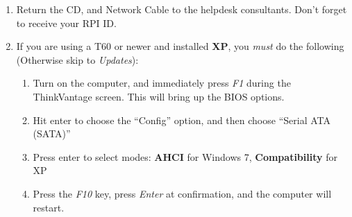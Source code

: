 \documentclass[10pt]{article}
\begin{document}
\begin{enumerate}
\item Return the CD, and Network Cable to the helpdesk consultants. Don't forget to receive your RPI ID.
\item If you are using a T60 or newer and installed {\bf XP}, you \emph{must} do the following (Otherwise skip to \emph{Updates}):
\begin{enumerate} %
\item Turn on the computer, and immediately press \emph{F1} during the ThinkVantage screen. This will bring up the BIOS options.
\item Hit enter to choose the ``Config'' option, and then choose ``Serial ATA (SATA)''
\item Press enter to select modes: {\bf AHCI} for Windows 7, {\bf Compatibility} for XP
\item Press the \emph{F10} key, press \emph{Enter} at confirmation, and the computer will restart.
\end{enumerate} %
\end{enumerate}


\end{document}
